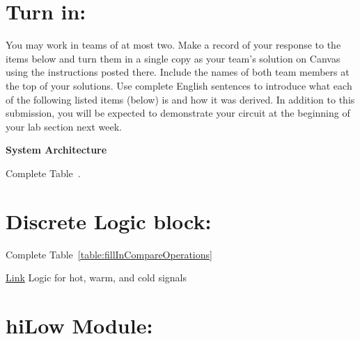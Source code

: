 \hypertarget{turn-in}{%
\section{Turn in:}\label{turn-in}}

You may work in teams of at most two. Make a record of your response to
the items below and turn them in a single copy as your team's solution
on Canvas using the instructions posted there. Include the names of both
team members at the top of your solutions. Use complete English
sentences to introduce what each of the following listed items (below)
is and how it was derived. In addition to this submission, you will be
expected to demonstrate your circuit at the beginning of your lab
section next week.

\textbf{System Architecture}

Complete Table~.

\hypertarget{discrete-logic-block-1}{%
\section{Discrete Logic block:}\label{discrete-logic-block-1}}

Complete Table~\ref{table:fillInCompareOperations}

\protect\hyperlink{hotWarmCold_Logic}{Link} Logic for hot, warm, and
cold signals

\hypertarget{hilow-module-1}{%
\section{\texorpdfstring{hiLow Module:
}{hiLow Module: }}\label{hilow-module-1}}

